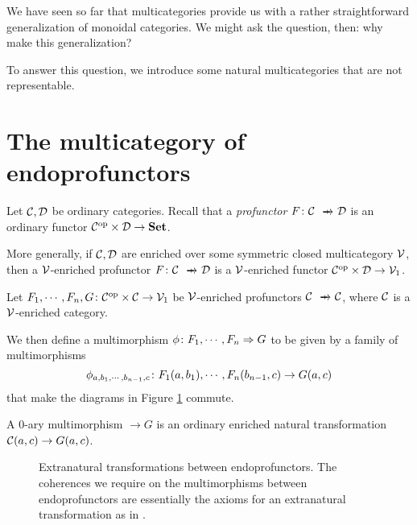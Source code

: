 We have seen so far that multicategories provide us with a rather straightforward generalization of monoidal categories.  
We might ask the question, then: why make this generalization? 

To answer this question, we introduce some natural multicategories that are not representable.

\section{The multicategory of endoprofunctors}
\label{SecEndoprofunctors}

Let ${\mathcal{C}},{\mathcal{D}}$ be ordinary categories.  
Recall that a \emph{profunctor} $F \from \C \pto \D$ is an ordinary functor ${\mathcal{C}}^{\mathrm{op}} \times {\mathcal{D}}\to{\normalfont\textbf{Set}}$.

More generally, if ${\mathcal{C}},{\mathcal{D}}$ are enriched over some symmetric closed multicategory ${\mathcal{V}}$, then a ${\mathcal{V}}$-enriched profunctor $F \from \C \pto \D$ is a ${\mathcal{V}}$-enriched functor ${\mathcal{C}}^{\mathrm{op}}\times{\mathcal{D}}\to{\mathcal{V}}_1$.

Let $F_1,\cdots,F_n,G \colon {\mathcal{C}}^{\mathrm{op}} \times {\mathcal{C}} \to {\mathcal{V}}_1$ be ${\mathcal{V}}$-enriched profunctors $\C\pto \C$, where ${\mathcal{C}}$ is a ${\mathcal{V}}$-enriched category.

We then define a multimorphism $\phi\colon F_1,\cdots,F_n \Rightarrow G$ to be given by a family of multimorphisms
\[
  \phi_{a,b_1,\cdots,b_{n-1},c} \colon F_1(a,b_1),\cdots,F_n(b_{n-1},c) \to G(a,c)
  \]
that make the diagrams in Figure \ref{FigExtranatural} commute.

A $0$-ary multimorphism $\to G$ is an ordinary enriched natural transformation ${\mathcal{C}}(a,c) \to G(a,c)$.
\begin{figure}
  \caption[Extranatural transformations between endoprofunctors.]
  {Extranatural transformations between endoprofunctors.
  The coherences we require on the multimorphisms between endoprofunctors are essentially the axioms for an extranatural transformation as in \cite{ExtranaturalTransformations}.}
  \label{FigExtranatural}
\end{figure}

